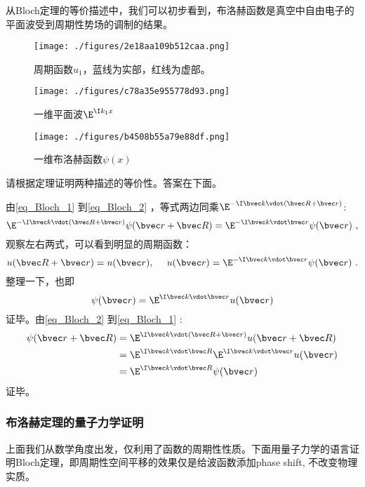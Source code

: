从Bloch定理的等价描述中，我们可以初步看到，布洛赫函数是真空中自由电子的平面波受到周期性势场的调制的结果。

\begin{figure}[ht]
\centering
\texttt{[image: ./figures/2e18aa109b512caa.png]}
\caption{周期函数$u_1$，蓝线为实部，红线为虚部。} \label{fig_Bloch_3}
\end{figure}

\begin{figure}[ht]
\centering
\texttt{[image: ./figures/c78a35e955778d93.png]}
\caption{一维平面波$\E^{\I k_1 x}$} \label{fig_Bloch_4}
\end{figure}

\begin{figure}[ht]
\centering
\texttt{[image: ./figures/b4508b55a79e88df.png]}
\caption{一维布洛赫函数$\psi(x)$} \label{fig_Bloch_5}
\end{figure}

\begin{exercise}{}
请根据定理证明两种描述的等价性。答案在下面。
\end{exercise}
由\autoref{eq_Bloch_1} 到\autoref{eq_Bloch_2} ，等式两边同乘$\E^{-\I \bvec k \vdot (\bvec R + \bvec r)}$:
\begin{equation}
\E^{-\I \bvec k \vdot (\bvec R + \bvec r)}\psi(\bvec r + \bvec R) = \E^{-\I \bvec k \vdot \bvec r}\psi(\bvec r)~,
\end{equation}
观察左右两式，可以看到明显的周期函数：
\begin{equation}
u(\bvec R + \bvec r) = u(\bvec r),~\quad u(\bvec r) = \E^{-\I \bvec k \vdot \bvec r}\psi(\bvec r)~.
\end{equation}
整理一下，也即
\begin{equation}
\psi(\bvec r) = \E^{\I \bvec k \vdot \bvec r} u(\bvec r)
\end{equation}
证毕。由\autoref{eq_Bloch_2} 到\autoref{eq_Bloch_1} :
\begin{align}
\psi(\bvec r + \bvec R) &= \E^{\I \bvec k \vdot (\bvec R + \bvec r)} u(\bvec r + \bvec R)\\
&= \E^{\I \bvec k \vdot \bvec R } \E^{\I \bvec k \vdot  \bvec r}u(\bvec r )\\ &= \E^{\I \bvec k \vdot \bvec R } \psi(\bvec r)
\end{align}
证毕。

\subsubsection{布洛赫定理的量子力学证明}
上面我们从数学角度出发，仅利用了函数的周期性性质。下面用量子力学的语言证明Bloch定理，即周期性空间平移的效果仅是给波函数添加phase shift, 不改变物理实质。

